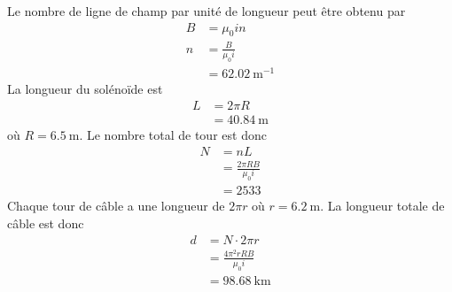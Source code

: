 \begin{reponsebox}
  Le nombre de ligne de champ par unité de longueur peut être obtenu par
  \begin{align*}
    B &= \mu_0 i n  \\
    n &= \frac{B}{\mu_0 i}  \\
      &= \SI{62.02}{\meter^{-1}}
  \end{align*}
  La longueur du solénoïde est
  \begin{align*}
    L &= 2\pi R  \\
      &= \SI{40.84}{\meter}
  \end{align*}
  où $R = \SI{6.5}{\meter}$. Le nombre total de tour est donc
  \begin{align*}
    N &= nL \\
      &= \frac{2\pi R B}{\mu_0 i}  \\
      &= 2533
  \end{align*}
  Chaque tour de câble a une longueur de $2\pi r$ où $r = \SI{6.2}{\meter}$. La
  longueur totale de câble est donc
  \begin{align*}
    d &= N\cdot 2\pi r  \\
      &= \frac{4\pi^2 rR B}{\mu_0 i}  \\
      &= \SI{98.68}{\kilo\meter}
  \end{align*}
\end{reponsebox}
